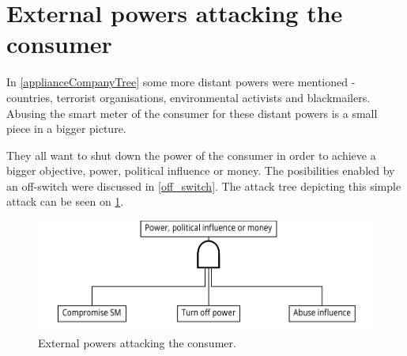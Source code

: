 
\section{External powers attacking the consumer}
In \cref{applianceCompanyTree} some more distant powers were mentioned - countries, terrorist organisations, environmental activists and blackmailers.
Abusing the smart meter of the consumer for these distant powers is a small piece in a bigger picture.

They all want to shut down the power of the consumer in order to achieve a bigger objective, power, political influence or money.
The posibilities enabled by an off-switch were discussed in \cref{off_switch}.
The attack tree depicting this simple attack can be seen on \cref{fig:attack_trees:external}.

\begin{figure}[H]
  \centering
	\includegraphics[width=.75\textwidth]{figures/graphviz/offswitch.pdf}
	\caption{External powers attacking the consumer.}
	\label{fig:attack_trees:external}
\end{figure}
